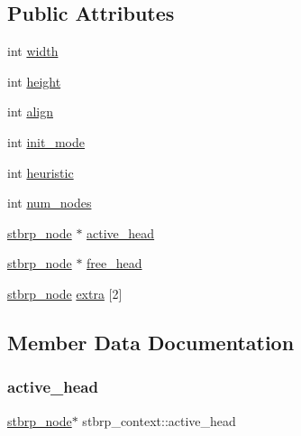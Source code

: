 \subsection*{Public Attributes}
\begin{DoxyCompactItemize}
\item 
int \mbox{\hyperlink{structstbrp__context_a70cfcb2044ce8397cc440d28b30c09b2}{width}}
\item 
int \mbox{\hyperlink{structstbrp__context_af3715a6f3faecfb4fac8f6ccbb71f9c7}{height}}
\item 
int \mbox{\hyperlink{structstbrp__context_ae36053e2001a725aec2b5756dc990481}{align}}
\item 
int \mbox{\hyperlink{structstbrp__context_a007509feee322404083034e4c2d3dc5d}{init\+\_\+mode}}
\item 
int \mbox{\hyperlink{structstbrp__context_a4b61a7f94e50a54c075e2a8f99f6503a}{heuristic}}
\item 
int \mbox{\hyperlink{structstbrp__context_afa8105d4ef6d3e0ae5aaf8e1ed4b2c58}{num\+\_\+nodes}}
\item 
\mbox{\hyperlink{structstbrp__node}{stbrp\+\_\+node}} $\ast$ \mbox{\hyperlink{structstbrp__context_a13277239636803aff28f00b0a0376120}{active\+\_\+head}}
\item 
\mbox{\hyperlink{structstbrp__node}{stbrp\+\_\+node}} $\ast$ \mbox{\hyperlink{structstbrp__context_a1336ae32373663847866cc65904c2839}{free\+\_\+head}}
\item 
\mbox{\hyperlink{structstbrp__node}{stbrp\+\_\+node}} \mbox{\hyperlink{structstbrp__context_a0b80e1fbdac125427526f3500d4e7624}{extra}} \mbox{[}2\mbox{]}
\end{DoxyCompactItemize}


\subsection{Member Data Documentation}
\mbox{\label{structstbrp__context_a13277239636803aff28f00b0a0376120}} 
\subsubsection{\texorpdfstring{active\+\_\+head}{active\_head}}
{\footnotesize\ttfamily \mbox{\hyperlink{structstbrp__node}{stbrp\+\_\+node}}$\ast$ stbrp\+\_\+context\+::active\+\_\+head}

